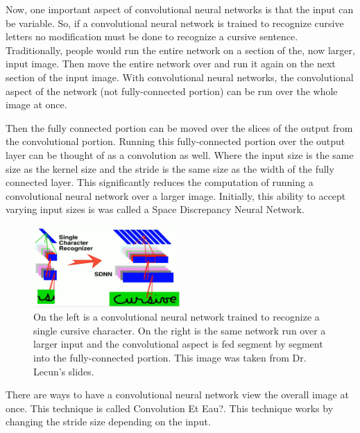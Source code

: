 Now, one important aspect of convolutional neural networks is that the input can be variable.  So, if a convolutional neural network is trained to recognize cursive letters no modification must be done to recognize a cursive sentence. Traditionally, people would run the entire network on a section of the, now larger, input image. Then move the entire network over and run it again on the next section of the input image. With convolutional neural networks, the convolutional aspect of the network (not fully-connected portion) can be run over the whole image at once.

Then the fully connected portion can be moved over the slices of the output from the convolutional portion. Running this fully-connected portion over the output layer can be thought of as a convolution as well.
Where the input size is the same size as the kernel size and the stride is the same size as the width of the fully connected layer. This significantly reduces the computation of running a convolutional neural network over a larger image. Initially, this ability to accept varying input sizes is was called a Space Discrepancy Neural Network.

\begin{figure}[ht]
  \centering
      \includegraphics[width=0.5\textwidth]{figs/SDNN.png}
          \caption{
            On the left is a convolutional neural network trained to recognize a single cursive character.
            On the right is the same network run over a larger input and the convolutional aspect is fed segment by segment into the fully-connected portion.
            This image was taken from Dr. Lecun's slides.
          }
\end{figure}

There are ways to have a convolutional neural network view the overall image at once. This technique is called Convolution Et Eau?. This technique works by changing the stride size depending on the input.